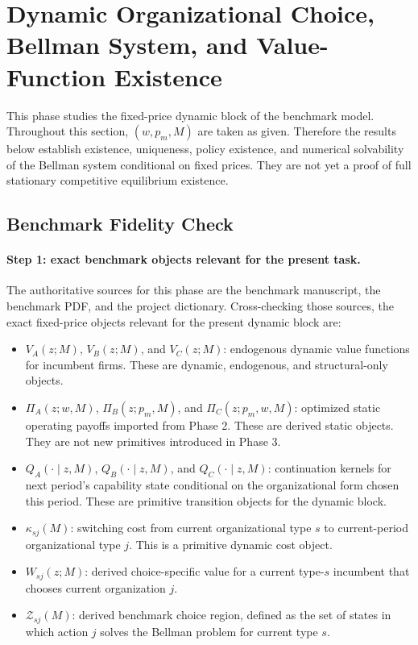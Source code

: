 ﻿\section{Dynamic Organizational Choice, Bellman System, and Value-Function Existence}

This phase studies the fixed-price dynamic block of the benchmark model. Throughout this section, $(w,p_m,M)$ are taken as given. Therefore the results below establish existence, uniqueness, policy existence, and numerical solvability of the Bellman system conditional on fixed prices. They are not yet a proof of full stationary competitive equilibrium existence.

\subsection{Benchmark Fidelity Check}

\paragraph{Step 1: exact benchmark objects relevant for the present task.}
The authoritative sources for this phase are the benchmark manuscript, the benchmark PDF, and the project dictionary. Cross-checking those sources, the exact fixed-price objects relevant for the present dynamic block are:
\begin{itemize}
    \item $V_A(z;M)$, $V_B(z;M)$, and $V_C(z;M)$: endogenous dynamic value functions for incumbent firms. These are dynamic, endogenous, and structural-only objects.
    \item $\Pi_A(z;w,M)$, $\Pi_B(z;p_m,M)$, and $\Pi_C(z;p_m,w,M)$: optimized static operating payoffs imported from Phase 2. These are derived static objects. They are not new primitives introduced in Phase 3.
    \item $Q_A(\cdot\mid z,M)$, $Q_B(\cdot\mid z,M)$, and $Q_C(\cdot\mid z,M)$: continuation kernels for next period's capability state conditional on the organizational form chosen this period. These are primitive transition objects for the dynamic block.
    \item $\kappa_{sj}(M)$: switching cost from current organizational type $s$ to current-period organizational type $j$. This is a primitive dynamic cost object.
    \item $W_{sj}(z;M)$: derived choice-specific value for a current type-$s$ incumbent that chooses current organization $j$.
    \item $\mathcal Z_{sj}(M)$: derived benchmark choice region, defined as the set of states in which action $j$ solves the Bellman problem for current type $s$.
\end{itemize}

